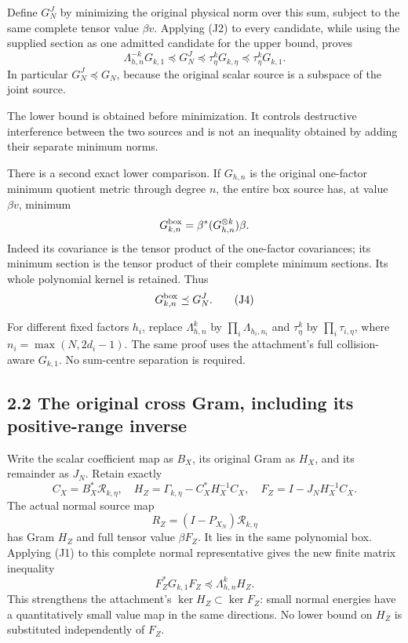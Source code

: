 Define \(G_N^J\) by minimizing the original physical norm over this sum, subject to the same complete tensor value \(\beta v\). Applying (J2) to every candidate, while using the supplied section as one admitted candidate for the upper bound, proves \[
 \boxed{
 \Lambda_{h,n}^{-k}G_{k,1}
 \preceq G_N^J
 \preceq\tau_\eta^kG_{k,\eta}
 \preceq\tau_\eta^kG_{k,1}.
 } \tag{J3}
\] In particular \(G_N^J\preceq G_N\), because the original scalar source is a subspace of the joint source.

The lower bound is obtained before minimization. It controls destructive interference between the two sources and is not an inequality obtained by adding their separate minimum norms.

There is a second exact lower comparison. If \(G_{h,n}\) is the original one-factor minimum quotient metric through degree \(n\), the entire box source has, at value \(\beta v\), minimum \[
 G_{k,n}^{\rm box}=\beta^*(G_{h,n}^{\otimes k})\beta.
\] Indeed its covariance is the tensor product of the one-factor covariances; its minimum section is the tensor product of their complete minimum sections. Its whole polynomial kernel is retained. Thus \[
 G_{k,n}^{\rm box}\preceq G_N^J. \tag{J4}
\]

For different fixed factors \(h_i\), replace \(\Lambda_{h,n}^k\) by \(\prod_i\Lambda_{h_i,n_i}\) and \(\tau_\eta^k\) by \(\prod_i\tau_{i,\eta}\), where \(n_i=\max(N,2d_i-1)\). The same proof uses the attachment's full collision-aware \(G_{k,1}\). No sum-centre separation is required.

\subsection{2.2 The original cross Gram, including its positive-range inverse}\label{the-original-cross-gram-including-its-positive-range-inverse}

Write the scalar coefficient map as \(B_X\), its original Gram as \(H_X\), and its remainder as \(J_N\). Retain exactly \[
 C_X=B_X^*\mathcal R_{k,\eta},\quad
 H_Z=\Gamma_{k,\eta}-C_X^*H_X^{-1}C_X,\quad
 F_Z=I-J_NH_X^{-1}C_X. \tag{J5}
\] The actual normal source map \[
 R_Z=(I-P_{X_N})\mathcal R_{k,\eta}
\] has Gram \(H_Z\) and full tensor value \(\beta F_Z\). It lies in the same polynomial box. Applying (J1) to this complete normal representative gives the new finite matrix inequality \[
 \boxed{F_Z^*G_{k,1}F_Z\preceq\Lambda_{h,n}^k H_Z.} \tag{J6}
\] This strengthens the attachment's \(\ker H_Z\subset\ker F_Z\): small normal energies have a quantitatively small value map in the same directions. No lower bound on \(H_Z\) is substituted independently of \(F_Z\).

